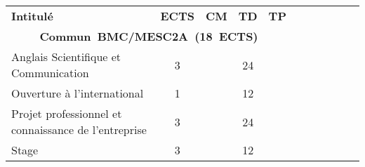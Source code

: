 


\renewcommand{\arraystretch}{1.5}%
\begin{tabular}{|m{5cm}|cm{0.75cm}|cm{0.75cm}|cm{0.75cm}|cm{0.75cm}|cm{0.75cm}|}
\cline{1-5}

\cellcolor{couleurFonce} \color{white}\bfseries Intitul\'e & \cellcolor{couleurFonce} \color{white}\bfseries ECTS & \cellcolor{couleurFonce} \color{white}\bfseries CM & \cellcolor{couleurFonce} \color{white}\bfseries TD & \cellcolor{couleurFonce} \color{white}\bfseries TP \\ \cline{1-5}
\cline{1-5} 
\multicolumn{5}{|c|}{\color{black} \mbox{\textbf{Commun BMC/MESC2A (18 ECTS)}}}  \\ \cline{1-5}

 \color{black} Anglais Scientifique et Communication & \color{black} 3 & \color{black} & \color{black} 24 & \color{black} \\ \cline{1-5}

 \cellcolor{couleurClaire} \color{couleurTexte} Ouverture à l'international & \cellcolor{couleurClaire} \color{couleurTexte} 1 & \cellcolor{couleurClaire} \color{couleurTexte} & \cellcolor{couleurClaire} \color{couleurTexte} 12 & \cellcolor{couleurClaire} \color{couleurTexte} \\ \cline{1-5}

 \color{black} Projet professionnel et connaissance de l'entreprise & \color{black} 3 & \color{black} & \color{black} 24 & \color{black} \\ \cline{1-5}

 \cellcolor{couleurClaire} \color{couleurTexte} Stage  & \cellcolor{couleurClaire} \color{couleurTexte} 3 & \cellcolor{couleurClaire} \color{couleurTexte} & \cellcolor{couleurClaire} \color{couleurTexte} 12 & \cellcolor{couleurClaire} \color{couleurTexte} 
\\ \cline{1-5}


\end{tabular}

